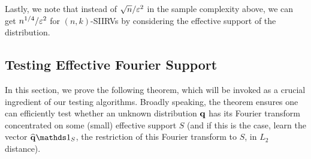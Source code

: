 Lastly, we note that instead of $\sqrt{n}/\varepsilon^2$ in the sample complexity above, we can get $n^{1/4}/\varepsilon^2$ for $(n,k)$-SIIRVs by considering the effective support of the distribution.

\subsection{Testing Effective Fourier Support}\label{sec:fourier:support:testing}
In this section, we prove the following theorem, which will be invoked as a crucial ingredient of our testing algorithms. Broadly speaking, the theorem ensures one can efficiently test whether an unknown distribution $\mathbf{q}$ has its Fourier transform concentrated on some (small) effective support $S$ (and if this is the case, learn the vector $\fourier{\q}\indicSet{S}$, the restriction of this Fourier transform to $S$, in $L_2$ distance).

